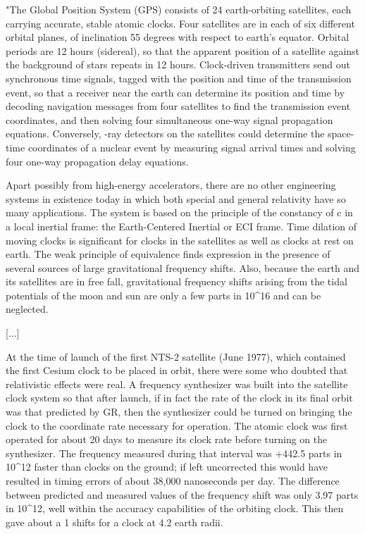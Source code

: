$$

"The Global Position System (GPS) consists of 24 earth-orbiting
satellites, each carrying accurate, stable atomic clocks.  Four
satellites are in each of six different orbital planes, of inclination
55 degrees with respect to earth's equator.  Orbital periods are 12
hours (sidereal), so that the apparent position of a satellite against
the background of stars repeats in 12 hours.  Clock-driven
transmitters send out synchronous time signals, tagged with the
position and time of the transmission event, so that a receiver near
the earth can determine its position and time by decoding navigation
messages from four satellites to find the transmission event
coordinates, and then solving four simultaneous one-way signal
propagation equations.  Conversely, \gamma -ray detectors on the
satellites could determine the space-time coordinates of a nuclear
event by measuring signal arrival times and solving four one-way
propagation delay equations.

Apart possibly from high-energy accelerators, there are no other
engineering systems in existence today in which both special and
general relativity have so many applications.  The system is based on
the principle of the constancy of c in a local inertial frame: the
Earth-Centered Inertial or ECI frame.  Time dilation of moving clocks
is significant for clocks in the satellites as well as clocks at rest
on earth.  The weak principle of equivalence finds expression in the
presence of several sources of large gravitational frequency
shifts.  Also, because the earth and its satellites are in free fall,
gravitational frequency shifts arising from the tidal potentials of
the moon and sun are only a few parts in 10^16 and can be neglected.

[...]

At the time of launch of the first NTS-2 satellite (June 1977), which
contained the first Cesium clock to be placed in orbit, there were
some who doubted that relativistic effects were real.  A frequency
synthesizer was built into the satellite clock system so that after
launch, if in fact the rate of the clock in its final orbit was that
predicted by GR, then the synthesizer could be turned on bringing the
clock to the coordinate rate necessary for operation.  The atomic
clock was first operated for about 20 days to measure its clock rate
before turning on the synthesizer.  The frequency measured during that
interval was +442.5 parts in 10^12 faster than clocks on the ground;
if left uncorrected this would have resulted in timing errors of about
38,000 nanoseconds per day. The difference between predicted and
measured values of the frequency shift was only 3.97 parts in 10^12,
well within the accuracy capabilities of the orbiting clock.  This then
gave about a 1%
shifts for a clock at 4.2 earth radii.

